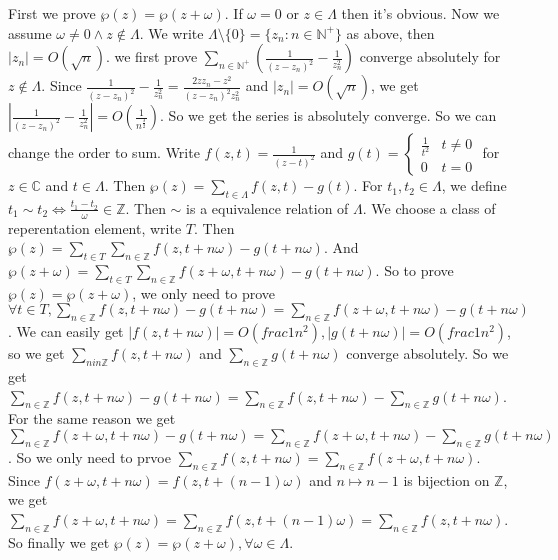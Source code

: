 \documentclass{ctexart}
\begin{document}
\begin{solution}
  First we prove \(\wp(z)=\wp(z+\omega)\). If \(\omega=0\) or \(z \in \Lambda\) then it's obvious. Now we assume \(\omega \neq 0 \wedge z \notin \Lambda\). 
  We write \(\Lambda\setminus \{0\}=\{z_n:n \in \mathbb{N}^+\}\) as above, then \(|z_n|=O(\sqrt{n})\). 
  we first prove \(\sum_{n \in \mathbb{N}^+} \left(\frac{1}{(z-z_n)^2}-\frac{1}{z_n^2}\right)\) converge absolutely for \(z \notin \Lambda\). 
  Since \(\frac{1}{(z-z_n)^2}-\frac{1}{z_n^2}=\frac{2z z_n-z^2}{(z-z_n)^2z_n^2}\) and \(|z_n|=O(\sqrt{n})\), 
  we get \(\left|\frac{1}{(z-z_n)^2}-\frac{1}{z_n^2}\right|=O(\frac{1}{n^{ \frac{3}{2}} })\). 
  So we get the series is absolutely converge. 
  So we can change the order to sum. 
  Write \(f(z,t)=\frac{1}{(z-t)^2}\) and \(g(t)=\begin{cases}
  \frac{1}{t^2} & t \neq 0\\
  0 & t = 0 
  \end{cases}\) for \(z \in \mathbb{C}\) and \(t \in \Lambda\). Then \(\wp(z)=\sum_{t \in \Lambda}f(z,t)-g(t)\). 
  For \(t_1,t_2 \in \Lambda\), we define \(t_1 \sim t_2 \iff \frac{t_1-t_2}{\omega} \in \mathbb{Z}\). 
  Then \(\sim\) is a equivalence relation of \(\Lambda\). 
  We choose a class of reperentation element, write \(T\). 
  Then \(\wp(z)=\sum_{t \in T}\sum_{n \in \mathbb{Z}}f(z,t+n \omega)-g(t+n \omega)\). 
  And \(\wp(z+\omega)=\sum_{t \in T}\sum_{n \in \mathbb{Z}}f(z+\omega,t+n \omega)-g(t+n \omega)\). 
  So to prove \(\wp(z)=\wp(z+\omega)\), we only need to prove \(\forall t \in T,\sum_{n \in \mathbb{Z}}f(z,t+n \omega)-g(t+n \omega)=\sum_{n \in \mathbb{Z}}f(z+\omega,t+n \omega)-g(t+n \omega)\). 
  We can easily get \(|f(z,t+n \omega)|=O(frac{1}{n^2}),|g(t+n \omega)|=O(frac{1}{n^2})\), so we get \(\sum_{n in \mathbb{Z}}f(z,t+ n \omega)\) and \(\sum_{n \in \mathbb{Z}}g(t+n \omega)\) converge absolutely. 
  So we get \(\sum_{n \in \mathbb{Z}}f(z,t+n \omega)-g(t+n \omega)=\sum_{n \in \mathbb{Z}}f(z,t+n \omega)-\sum_{n \in \mathbb{Z}}g(t+n \omega)\). 
  For the same reason we get \(\sum_{n \in \mathbb{Z}} f(z+\omega,t+n \omega)-g(t+n \omega)=\sum_{n \in \mathbb{Z}}f(z+\omega,t+n \omega)-\sum_{n \in \mathbb{Z}}g(t+n \omega)\). 
  So we only need to prvoe \(\sum_{n \in \mathbb{Z}}f(z,t+n \omega)=\sum_{n \in \mathbb{Z}}f(z+\omega,t+n \omega)\). 
  Since \(f(z+\omega,t+n \omega)=f(z,t+(n-1)\omega)\) and \(n \mapsto n-1\) is bijection on \(\mathbb{Z}\), we get 
  \(\sum_{n \in \mathbb{Z}}f(z+\omega,t+n \omega)=\sum_{n \in \mathbb{Z}}f(z,t+(n-1)\omega)=\sum_{n \in \mathbb{Z}}f(z,t+n \omega)\).
  So finally we get \(\wp(z)=\wp(z+\omega),\forall \omega \in \Lambda\). 


\end{solution}
\end{document}
